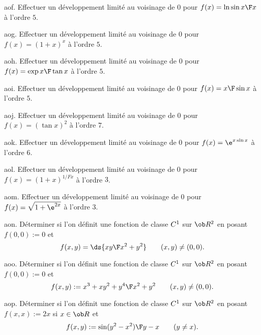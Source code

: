 \exo [Level=1,Fight=1,Learn=0,Type=\Exercices,Field=\DéveloppementsLimités,Origin=] aof. 
Effectuer un développement limité au voisinage de $0$ pour $f(x)=\ln{\sin x\F x}$ à l'ordre $5$.

\exo [Level=1,Fight=1,Learn=0,Type=\Exercices,Field=\DéveloppementsLimités,Origin=] aog. 
Effectuer un développement limité au voisinage de $0$ pour $f(x)=(1+x)^x$ à l'ordre $5$. 

\exo [Level=1,Fight=1,Learn=0,Type=\Exercices,Field=\DéveloppementsLimités,Origin=] aoh. 
Effectuer un développement limité au voisinage de $0$ pour  $f(x)=\exp{x\F\tan x}$ à l'ordre $5$.

\exo [Level=1,Fight=1,Learn=0,Type=\Exercices,Field=\DéveloppementsLimités,Origin=] aoi. 
Effectuer un développement limité au voisinage de $0$ pour $f(x)={x\F\sin x}$ à l'ordre $5$. 

\exo [Level=1,Fight=1,Learn=0,Type=\Exercices,Field=\DéveloppementsLimités,Origin=] aoj. 
Effectuer un développement limité au voisinage de $0$ pour  $f(x)=(\tan x)^2$ à l'ordre $7$. 

\exo [Level=1,Fight=1,Learn=0,Type=\Exercices,Field=\DéveloppementsLimités,Origin=] aok. 
Effectuer un développement limité au voisinage de $0$ pour  $f(x)=\e^{x\sin x}$ à l'ordre $6$. 

\exo [Level=1,Fight=1,Learn=0,Type=\Exercices,Field=\DéveloppementsLimités,Origin=] aol. 
Effectuer un développement limité au voisinage de $0$ pour  $f(x)=(1+x)^{1/F x}$ à l'ordre $3$. 

\exo [Level=1,Fight=1,Learn=0,Type=\Exercices,Field=\DéveloppementsLimités,Origin=] aom. 
Effectuer un développement limité au voisinage de $0$ pour $f(x)=\sqrt{1+\e^{2x}}$ à l'ordre $3$. 

\exo [Level=2,Fight=0,Learn=1,Type=\TravauxDirigés,Field=\Dérivation,Origin=] aon. 
Déterminer si l'on définit une fonction de classe $\sc C^1$ sur $\ob R^2$ en posant $f(0,0):=0$ et 
$$
f(x,y)=\ds{xy\F x^2+y^2}\qquad  (x,y)\neq(0,0).
$$

\exo [Level=2,Fight=0,Learn=1,Type=\TravauxDirigés,Field=\Dérivation,Origin=] aoo. 
Déterminer si l'on définit une fonction de classe $\sc C^1$ sur $\ob R^2$ en posant $f(0,0):=0$ et 
$$
f(x,y):={x^3+xy^2+y^4\F x^2+y^2}\qquad(x,y)\neq(0,0).
$$

\exo [Level=2,Fight=0,Learn=1,Type=\TravauxDirigés,Field=\Dérivation,Origin=] aop. 
Déterminer si l'on définit une fonction de classe $\sc C^1$ sur $\ob R^2$ en posant $f(x,x):=2x$ si $x\in\ob R$ et 
$$
f(x,y):={\sin(y^2-x^2)\F y-x}\qquad(y\neq x).
$$

